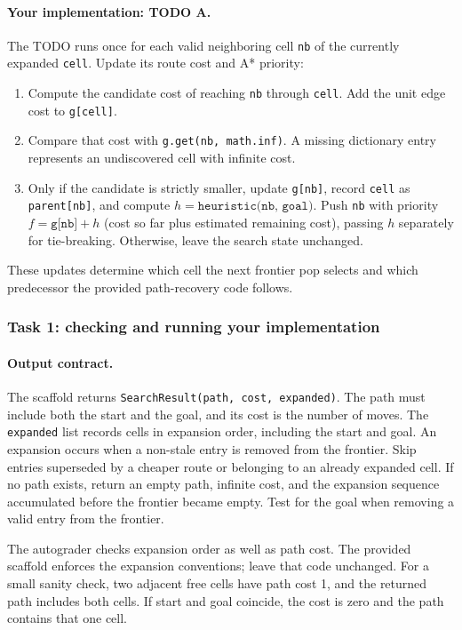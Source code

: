 \documentclass[11pt]{article}
\begin{document}
\paragraph{Your implementation: TODO A.}
The TODO runs once for each valid neighboring cell \texttt{nb} of the
currently expanded \texttt{cell}. Update its route cost and A* priority:
\begin{enumerate}
\item Compute the candidate cost of reaching \texttt{nb} through
\texttt{cell}. Add the unit edge cost to \texttt{g[cell]}.
\item Compare that cost with \texttt{g.get(nb, math.inf)}. A missing
dictionary entry represents an undiscovered cell with infinite cost.
\item Only if the candidate is strictly smaller, update \texttt{g[nb]},
record \texttt{cell} as \texttt{parent[nb]}, and compute
$h=\texttt{heuristic(nb, goal)}$. Push \texttt{nb} with priority
$f=\texttt{g[nb]}+h$ (cost so far plus estimated remaining cost),
passing $h$ separately for tie-breaking. Otherwise, leave the search
state unchanged.
\end{enumerate}
These updates determine which cell the next frontier pop selects and
which predecessor the provided path-recovery code follows.

\clearpage
\subsubsection*{Task 1: checking and running your implementation}

\paragraph{Output contract.}
The scaffold returns \texttt{SearchResult(path, cost, expanded)}. The path must
include both the start and the goal, and its cost is the number of moves.
The \texttt{expanded} list records cells in expansion order, including
the start and goal. An expansion occurs when a non-stale entry is
removed from the frontier. Skip entries superseded by a cheaper route
or belonging to an already expanded cell. If no path exists, return an
empty path, infinite cost, and the expansion sequence accumulated before
the frontier became empty. Test for the goal when removing a valid entry
from the frontier.

The autograder checks expansion order as well as path cost. The provided
scaffold enforces the expansion conventions; leave that code unchanged.
For a small sanity check, two adjacent free cells have path cost 1, and
the returned path includes both cells. If start and goal coincide, the
cost is zero and the path contains that one cell.
\end{document}
